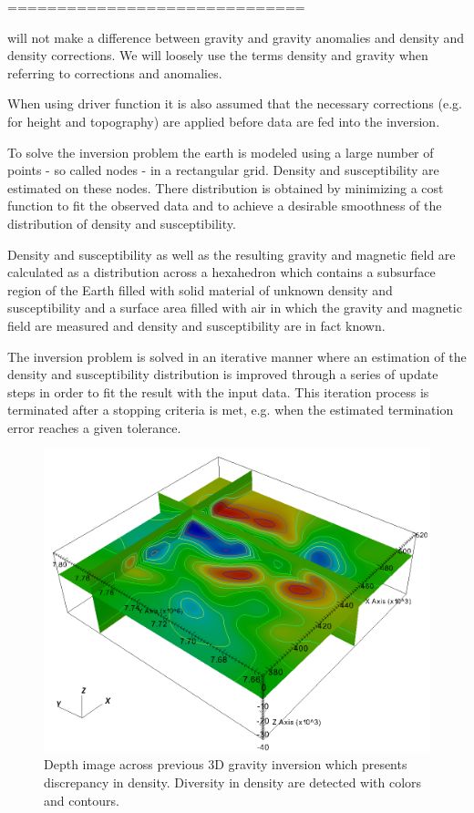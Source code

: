   

==============================

will not make a difference between gravity and gravity anomalies 
and density and density corrections. We will loosely use the terms density and gravity when referring to corrections and anomalies.  

When using \downunder driver function it is also assumed that the necessary corrections (e.g. for height and topography) are applied 
before data are fed into the inversion. 
 
To solve the inversion problem 
the earth is modeled using a large number of points - so called nodes - in a rectangular grid.
Density and susceptibility are estimated on these nodes. 
There distribution is obtained by minimizing a cost function to fit the observed data and to achieve 
a desirable smoothness of the distribution of density and susceptibility. 

 

Density and susceptibility as well as the resulting gravity and magnetic field
are calculated as a distribution across a hexahedron which contains a subsurface region of the Earth filled
with solid material of unknown density and susceptibility and a surface area filled with air 
in which the gravity and magnetic field are measured and density and susceptibility are in fact known.

The inversion problem is solved in an iterative manner 
where an estimation of the density and susceptibility distribution
is improved through a series of update steps in order to fit the result with the input data. 
This iteration process is terminated after a stopping criteria is met, e.g. when the estimated 
termination error reaches a given tolerance.





\begin{figure}
\centering
\includegraphics[width=\textwidth]{density11.png}
\caption{Depth image across previous 3D gravity inversion which presents discrepancy in density. Diversity in density are detected with colors and contours.}
\end{figure}





